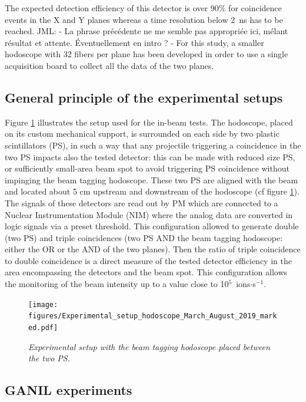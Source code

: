 \documentclass[a4paper,11pt]{article}
\newcommand\jml[1]{\color{jmlcolor}JML: - #1 - \color{black}}
\begin{document}
The expected detection efficiency of this detector is over 90\% for coincidence events in the X and Y planes whereas a time resolution below 2~ns has to be reached. \jml{La phrase précédente ne me semble pas appropriée ici, mélant résultat et attente. Éventuellement en intro ?} For this study, a smaller hodoscope with 32 fibers per plane has been developed in order to use a single acquisition board to collect all the data of the two planes.


\subsection{General principle of the experimental setups}

Figure \ref{fig:Picture_Setup_hodo} illustrates the setup used for the in-beam tests.
The hodoscope, placed on its custom mechanical support, is surrounded on each side by two plastic scintillators (PS), in such a way that any projectile triggering a coincidence in the two PS impacts also the tested detector: this can be made with reduced size PS, or sufficiently small-area beam spot to avoid triggering PS coincidence without impinging the beam tagging hodoscope. These two PS are aligned with the beam and located about 5 cm upstream and downstream of the hodoscope (cf figure \ref{fig:Picture_Setup_hodo}). The signals of these detectors are read out by PM which are connected to a Nuclear Instrumentation Module (NIM) where the analog data are converted in logic signals via a preset threshold. This configuration allowed to generate double (two PS) and triple coincidences (two PS AND the beam tagging hodoscope: either the OR or the AND of the two planes). Then the ratio of triple coincidence to double coincidence is a direct measure of the tested detector efficiency in the area encompassing the detectors and the beam spot. This configuration allows the monitoring of the beam intensity up to a value close to {10}$^{5}$~ions$\cdot$s$^{-1}$.

\begin{figure}[htb]
\centering
\texttt{[image: figures/Experimental\_setup\_hodoscope\_March\_August\_2019\_marked.pdf]}
\caption{\small{\textit{Experimental setup with the beam tagging hodoscope placed between the two PS.}}}
\label{fig:Picture_Setup_hodo}
\end{figure}


\subsection{GANIL experiments}
\end{document}
